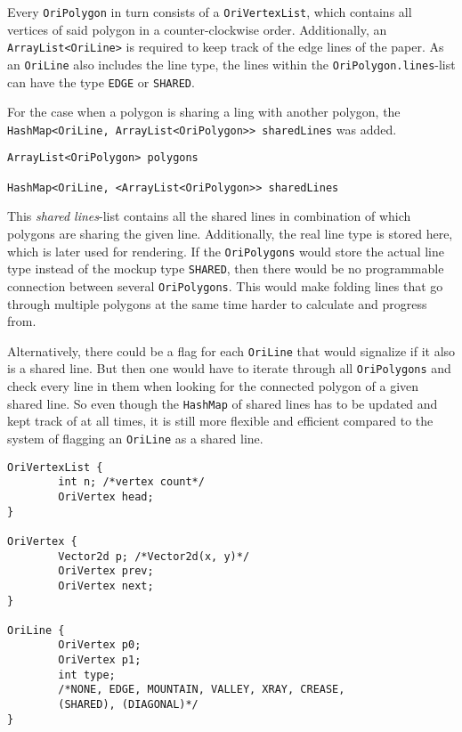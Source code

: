 \noindent Every \texttt{OriPolygon} in turn consists of a \texttt{OriVertexList}, which contains all vertices of said polygon in a counter-clockwise order. Additionally, an \texttt{ArrayList<OriLine>} is required to keep track of the edge lines of the paper. As an \texttt{OriLine} also includes the line type, the lines within the \texttt{OriPolygon.lines}-list can have the type \texttt{EDGE} or \texttt{SHARED}.

For the case when a polygon is sharing a ling with another polygon, the \texttt{HashMap<OriLine, ArrayList<OriPolygon>> sharedLines} was added.

\begin{lstlisting}[label=paperModelImplementation,caption=New Implementation of Paper Model]
ArrayList<OriPolygon> polygons

HashMap<OriLine, <ArrayList<OriPolygon>> sharedLines
\end{lstlisting}

This \emph{shared lines}-list contains all the shared lines in combination of which polygons are sharing the given line. Additionally, the real line type is stored here, which is later used for rendering. If the \texttt{OriPolygons} would store the actual line type instead of the mockup type \texttt{SHARED}, then there would be no programmable connection between several \texttt{OriPolygons}. This would make folding lines that go through multiple polygons at the same time harder to calculate and progress from.

Alternatively, there could be a flag for each \texttt{OriLine} that would signalize if it also is a shared line. But then one would have to iterate through all \texttt{OriPolygons} and check every line in them when looking for the connected polygon of a given shared line. So even though the \texttt{HashMap} of shared lines has to be updated and kept track of at all times, it is still more flexible and efficient compared to the system of flagging an \texttt{OriLine} as a shared line.

\begin{lstlisting}[label=oriVertexList,caption={OriVertexList, OriVertex, and OriLine}]
OriVertexList {
        int n; /*vertex count*/
        OriVertex head;
}

OriVertex {
        Vector2d p; /*Vector2d(x, y)*/
        OriVertex prev;
        OriVertex next;
}

OriLine {
        OriVertex p0;
        OriVertex p1;
        int type; 
        /*NONE, EDGE, MOUNTAIN, VALLEY, XRAY, CREASE, 
        (SHARED), (DIAGONAL)*/
}
\end{lstlisting}

